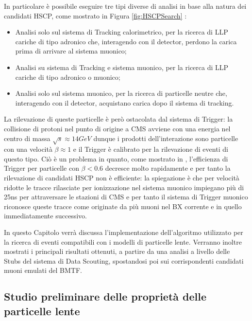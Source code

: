 \newpage

In particolare è possibile eseguire tre tipi diverse di analisi in base alla natura dei candidati HSCP, come mostrato in Figura \ref{fig:HSCPSearch} \cite{MasterThesisGioMoc}: 
\begin{itemize}
   \item Analisi solo sul sistema di Tracking calorimetrico, per la ricerca di LLP cariche di tipo adronico che, interagendo con il detector, perdono la carica prima di arrivare al sistema muonico;
   \item Analisi su sistema di Tracking e sistema muonico, per la ricerca di LLP cariche di tipo adronico o muonico;
   \item Analisi solo sul sistema muonico, per la ricerca di particelle neutre che, interagendo con il detector, acquistano carica dopo il sistema di tracking.
\end{itemize}

La rilevazione di queste particelle è però ostacolata dal sistema di Trigger: la collisione di protoni nel punto di origine a CMS avviene con una energia nel centro di massa $\sqrt{s} \approx 14 \si{GeV}$ dunque i prodotti dell'interazione sono particelle con una velocità $\beta \approx 1$ e il Trigger è calibrato per la rilevazione di eventi di questo tipo. Ciò è un problema in quanto, come mostrato in \cite{MasterThesisGioMoc}, l'efficienza di Trigger per particelle con $\beta < 0.6$ decresce molto rapidamente e per tanto la rilevazione di candidati HSCP non è efficiente: la spiegazione è che per velocità ridotte le tracce rilasciate per ionizzazione nel sistema muonico impiegano più di 25ns per attraversare le stazioni di CMS e per tanto il sistema di Trigger muonico riconosce queste tracce come originate da più muoni nel BX corrente e in quello immediatamente successivo.

In questo Capitolo verrà discussa l'implementazione dell'algoritmo utilizzato per la ricerca di eventi compatibili con i modelli di particelle lente. Verranno inoltre mostrati i principali risultati ottenuti, a partire da una analisi a livello delle Stubs del sistema di Data Scouting, spostandosi poi sui corrispondenti candidati muoni emulati del BMTF.

\subsection{Studio preliminare delle proprietà delle particelle lente}

